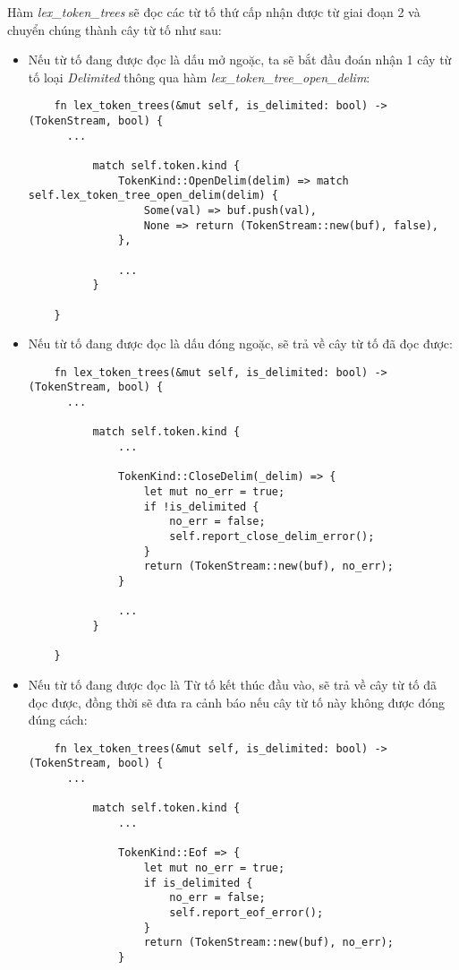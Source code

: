 Hàm \textit{lex\_token\_trees} sẽ đọc các từ tố thứ cấp nhận được từ giai đoạn 2 và chuyển chúng thành cây từ tố như sau:

\begin{itemize}
  \item Nếu từ tố đang được đọc là dấu mở ngoặc, ta sẽ bắt đầu đoán nhận 1 cây từ tố loại \textit{Delimited} thông qua hàm \textit{lex\_token\_tree\_open\_delim}:
  \begin{lstlisting}
    fn lex_token_trees(&mut self, is_delimited: bool) -> (TokenStream, bool) {
      ...
  
          match self.token.kind {
              TokenKind::OpenDelim(delim) => match self.lex_token_tree_open_delim(delim) {
                  Some(val) => buf.push(val),
                  None => return (TokenStream::new(buf), false),
              },
              
              ...
          }
  
    }
  \end{lstlisting}
  \item Nếu từ tố đang được đọc là dấu đóng ngoặc, sẽ trả về cây từ tố đã đọc được:
  \begin{lstlisting}
    fn lex_token_trees(&mut self, is_delimited: bool) -> (TokenStream, bool) {
      ...
  
          match self.token.kind {
              ...
              
              TokenKind::CloseDelim(_delim) => {
                  let mut no_err = true;
                  if !is_delimited {
                      no_err = false;
                      self.report_close_delim_error();
                  }
                  return (TokenStream::new(buf), no_err);
              }
              
              ...
          }
  
    }
  \end{lstlisting}
  \item Nếu từ tố đang được đọc là Từ tố kết thúc đầu vào, sẽ trả về cây từ tố đã đọc được, đồng thời sẽ đưa ra cảnh báo nếu cây từ tố này không được đóng đúng cách:
  \begin{lstlisting}
    fn lex_token_trees(&mut self, is_delimited: bool) -> (TokenStream, bool) {
      ...
  
          match self.token.kind {
              ...

              TokenKind::Eof => {
                  let mut no_err = true;
                  if is_delimited {
                      no_err = false;
                      self.report_eof_error();
                  }
                  return (TokenStream::new(buf), no_err);
              }
              

\end{lstlisting}
\end{itemize}
